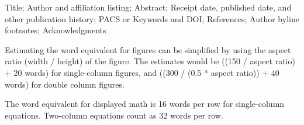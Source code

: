 \documentclass[%
 reprint,
superscriptaddress,
showpacs,preprintnumbers,
 amsmath,amssymb,
 aps,
 prl,
]{revtex4-1}
\begin{document}
Title;
Author and affiliation listing;
Abstract;
Receipt date, published date, and other publication history;
PACS or Keywords and DOI;\@
References;
Author byline footnotes;
Acknowledgments

Estimating the word equivalent for figures can be simplified by using the aspect
ratio (width / height) of the figure. The estimates would be ((150 / aspect
ratio) + 20 words) for single-column figures, and ((300 / (0.5 * aspect ratio))
+ 40 words) for double column figures.

The word equivalent for displayed math is 16 words per row for single-column
equations. Two-column equations count as 32 words per row.





\end{document}
